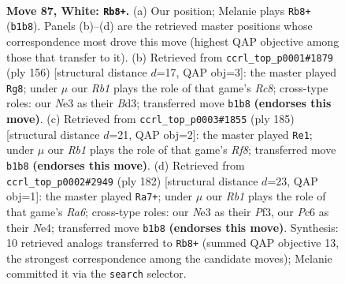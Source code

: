 \documentclass[11pt]{article}
\begin{document}
\clearpage

\begin{figure}[p]\centering
\begin{subfigure}{0.46\textwidth}\centering
\resizebox{\linewidth}{!}{%
\newchessgame
\chessboard[
  setfen={6k1/5rb1/R1P5/8/7K/4N3/8/1R6 w - - 13 87},
  showmover=false,
  pgfstyle=straightmove, color=movearrow, markmove={b1-b8}
]}
\caption{}
\end{subfigure}\hfill
\begin{subfigure}{0.46\textwidth}\centering
\resizebox{\linewidth}{!}{%
\newchessgame
\chessboard[
  setfen={2R5/b3r3/P2k4/8/8/3B4/3K4/8 w - - 14 79},
  showmover=false,
  pgfstyle=straightmove, color=movearrow, markmove={c8-g8}
]}
\caption{}
\end{subfigure}
\\[4pt]
\begin{subfigure}{0.46\textwidth}\centering
\resizebox{\linewidth}{!}{%
\newchessgame
\chessboard[
  setfen={8/4k1p1/R7/4K3/4B3/8/8/5r2 b - - 90 93},
  showmover=false,
  pgfstyle=straightmove, color=movearrow, markmove={f1-e1}
]}
\caption{}
\end{subfigure}\hfill
\begin{subfigure}{0.46\textwidth}\centering
\resizebox{\linewidth}{!}{%
\newchessgame
\chessboard[
  setfen={8/6k1/R7/5r2/4Nb2/5P2/6K1/8 w - - 18 92},
  showmover=false,
  pgfstyle=straightmove, color=movearrow, markmove={a6-a7}
]}
\caption{}
\end{subfigure}
\caption{\textbf{Move 87, White: \texttt{Rb8+}.} (a) Our position; Melanie plays \texttt{Rb8+} (\texttt{b1b8}). Panels (b)--(d) are the retrieved master positions whose correspondence most drove this move (highest QAP objective among those that transfer to it). (b) Retrieved from \texttt{ccrl\_top\_p0001\#1879} (ply 156) [structural distance $d$=17, QAP obj=3]: the master played \texttt{Rg8}; under $\mu$ our \emph{Rb1} plays the role of that game's \emph{Rc8}; cross-type roles: our \emph{N}e3 as their \emph{B}d3; transferred move \texttt{b1b8} \textbf{(endorses this move)}. (c) Retrieved from \texttt{ccrl\_top\_p0003\#1855} (ply 185) [structural distance $d$=21, QAP obj=2]: the master played \texttt{Re1}; under $\mu$ our \emph{Rb1} plays the role of that game's \emph{Rf8}; transferred move \texttt{b1b8} \textbf{(endorses this move)}. (d) Retrieved from \texttt{ccrl\_top\_p0002\#2949} (ply 182) [structural distance $d$=23, QAP obj=1]: the master played \texttt{Ra7+}; under $\mu$ our \emph{Rb1} plays the role of that game's \emph{Ra6}; cross-type roles: our \emph{N}e3 as their \emph{P}f3, our \emph{P}c6 as their \emph{N}e4; transferred move \texttt{b1b8} \textbf{(endorses this move)}. Synthesis: 10 retrieved analogs transferred to \texttt{Rb8+} (summed QAP objective 13, the strongest correspondence among the candidate moves); Melanie committed it via the \texttt{search} selector.}
\label{fig:thought-m172}
\end{figure}
\end{document}
